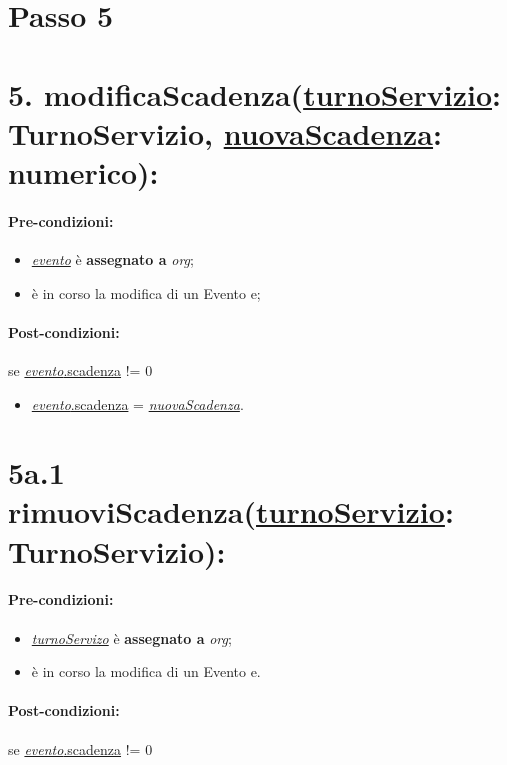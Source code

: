 \section{Passo 5}
\section*{5. modificaScadenza(\underline{turnoServizio}: TurnoServizio, \underline{nuovaScadenza}: numerico):}

\paragraph{Pre-condizioni:}
\begin{itemize}
     \item \underline{\textit{evento}} è \textbf{assegnato a} {\textit{org}};
    \item è in corso la modifica di un Evento e;
\end{itemize}

\paragraph{Post-condizioni:}  se \underline{\textit{evento}.scadenza} != 0

\begin{itemize}
    \item \underline{\textit{evento}.scadenza} = \underline{\textit{nuovaScadenza}}.
\end{itemize}

\section*{5a.1 rimuoviScadenza(\underline{turnoServizio}: TurnoServizio):}

\paragraph{Pre-condizioni:}
\begin{itemize}
     \item \underline{\textit{turnoServizo}} è \textbf{assegnato a} {\textit{org}};
    \item è in corso la modifica di un Evento e.
\end{itemize}

\paragraph{Post-condizioni:}  se \underline{\textit{evento}.scadenza} != 0

